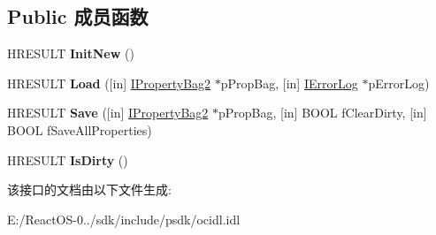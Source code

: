 \subsection*{Public 成员函数}
\begin{DoxyCompactItemize}
\item 
\mbox{\label{interface_i_persist_property_bag2_ad2c516f0421be41a0fafc49792dd8a8a}} 
H\+R\+E\+S\+U\+LT {\bfseries Init\+New} ()
\item 
\mbox{\label{interface_i_persist_property_bag2_a79e0803ee25f80167a8f19c6a44a5220}} 
H\+R\+E\+S\+U\+LT {\bfseries Load} (\mbox{[}in\mbox{]} \hyperlink{interface_i_property_bag2}{I\+Property\+Bag2} $\ast$p\+Prop\+Bag, \mbox{[}in\mbox{]} \hyperlink{interface_i_error_log}{I\+Error\+Log} $\ast$p\+Error\+Log)
\item 
\mbox{\label{interface_i_persist_property_bag2_a0762a57e46fb2daafb0d4ffa6eac5257}} 
H\+R\+E\+S\+U\+LT {\bfseries Save} (\mbox{[}in\mbox{]} \hyperlink{interface_i_property_bag2}{I\+Property\+Bag2} $\ast$p\+Prop\+Bag, \mbox{[}in\mbox{]} B\+O\+OL f\+Clear\+Dirty, \mbox{[}in\mbox{]} B\+O\+OL f\+Save\+All\+Properties)
\item 
\mbox{\label{interface_i_persist_property_bag2_aa0a9285555c27488d35e01776781e21d}} 
H\+R\+E\+S\+U\+LT {\bfseries Is\+Dirty} ()
\end{DoxyCompactItemize}


该接口的文档由以下文件生成\+:\begin{DoxyCompactItemize}
\item 
E\+:/\+React\+O\+S-\/0../sdk/include/psdk/ocidl.\+idl\end{DoxyCompactItemize}
